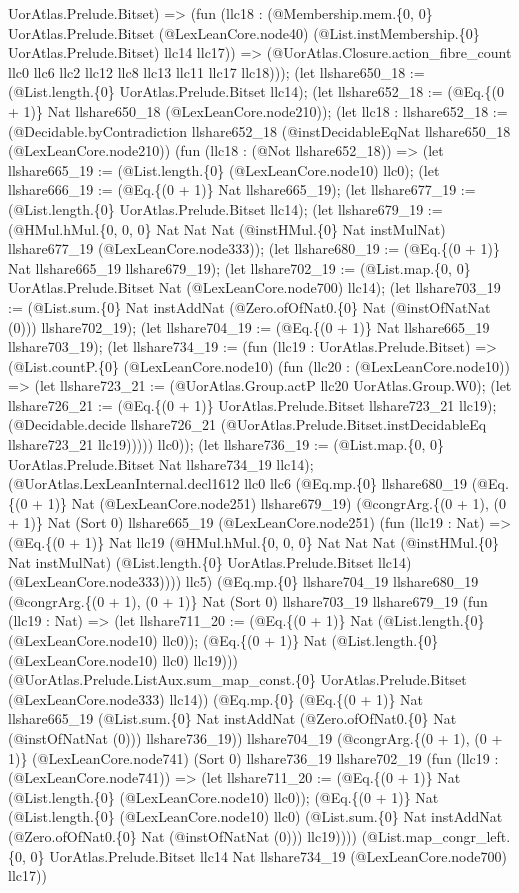 \documentclass[11pt]{article}
\begin{document}
UorAtlas.Prelude.Bitset) => (fun (llc18 : (@Membership.mem.\{0, 0\} UorAtlas.Prelude.Bitset (@LexLeanCore.node40) (@List.instMembership.\{0\} UorAtlas.Prelude.Bitset) llc14 llc17)) => (@UorAtlas.Closure.action\_fibre\_count llc0 llc6 llc2 llc12 llc8 llc13 llc11 llc17 llc18))); (let llshare650\_18 := (@List.length.\{0\} UorAtlas.Prelude.Bitset llc14); (let llshare652\_18 := (@Eq.\{(0 + 1)\} Nat llshare650\_18 (@LexLeanCore.node210)); (let llc18 : llshare652\_18 := (@Decidable.byContradiction llshare652\_18 (@instDecidableEqNat llshare650\_18 (@LexLeanCore.node210)) (fun (llc18 : (@Not llshare652\_18)) => (let llshare665\_19 := (@List.length.\{0\} (@LexLeanCore.node10) llc0); (let llshare666\_19 := (@Eq.\{(0 + 1)\} Nat llshare665\_19); (let llshare677\_19 := (@List.length.\{0\} UorAtlas.Prelude.Bitset llc14); (let llshare679\_19 := (@HMul.hMul.\{0, 0, 0\} Nat Nat Nat (@instHMul.\{0\} Nat instMulNat) llshare677\_19 (@LexLeanCore.node333)); (let llshare680\_19 := (@Eq.\{(0 + 1)\} Nat llshare665\_19 llshare679\_19); (let llshare702\_19 := (@List.map.\{0, 0\} UorAtlas.Prelude.Bitset Nat (@LexLeanCore.node700) llc14); (let llshare703\_19 := (@List.sum.\{0\} Nat instAddNat (@Zero.ofOfNat0.\{0\} Nat (@instOfNatNat (0))) llshare702\_19); (let llshare704\_19 := (@Eq.\{(0 + 1)\} Nat llshare665\_19 llshare703\_19); (let llshare734\_19 := (fun (llc19 : UorAtlas.Prelude.Bitset) => (@List.countP.\{0\} (@LexLeanCore.node10) (fun (llc20 : (@LexLeanCore.node10)) => (let llshare723\_21 := (@UorAtlas.Group.actP llc20 UorAtlas.Group.W0); (let llshare726\_21 := (@Eq.\{(0 + 1)\} UorAtlas.Prelude.Bitset llshare723\_21 llc19); (@Decidable.decide llshare726\_21 (@UorAtlas.Prelude.Bitset.instDecidableEq llshare723\_21 llc19))))) llc0)); (let llshare736\_19 := (@List.map.\{0, 0\} UorAtlas.Prelude.Bitset Nat llshare734\_19 llc14); (@UorAtlas.LexLeanInternal.decl1612 llc0 llc6 (@Eq.mp.\{0\} llshare680\_19 (@Eq.\{(0 + 1)\} Nat (@LexLeanCore.node251) llshare679\_19) (@congrArg.\{(0 + 1), (0 + 1)\} Nat (Sort 0) llshare665\_19 (@LexLeanCore.node251) (fun (llc19 : Nat) => (@Eq.\{(0 + 1)\} Nat llc19 (@HMul.hMul.\{0, 0, 0\} Nat Nat Nat (@instHMul.\{0\} Nat instMulNat) (@List.length.\{0\} UorAtlas.Prelude.Bitset llc14) (@LexLeanCore.node333)))) llc5) (@Eq.mp.\{0\} llshare704\_19 llshare680\_19 (@congrArg.\{(0 + 1), (0 + 1)\} Nat (Sort 0) llshare703\_19 llshare679\_19 (fun (llc19 : Nat) => (let llshare711\_20 := (@Eq.\{(0 + 1)\} Nat (@List.length.\{0\} (@LexLeanCore.node10) llc0)); (@Eq.\{(0 + 1)\} Nat (@List.length.\{0\} (@LexLeanCore.node10) llc0) llc19))) (@UorAtlas.Prelude.ListAux.sum\_map\_const.\{0\} UorAtlas.Prelude.Bitset (@LexLeanCore.node333) llc14)) (@Eq.mp.\{0\} (@Eq.\{(0 + 1)\} Nat llshare665\_19 (@List.sum.\{0\} Nat instAddNat (@Zero.ofOfNat0.\{0\} Nat (@instOfNatNat (0))) llshare736\_19)) llshare704\_19 (@congrArg.\{(0 + 1), (0 + 1)\} (@LexLeanCore.node741) (Sort 0) llshare736\_19 llshare702\_19 (fun (llc19 : (@LexLeanCore.node741)) => (let llshare711\_20 := (@Eq.\{(0 + 1)\} Nat (@List.length.\{0\} (@LexLeanCore.node10) llc0)); (@Eq.\{(0 + 1)\} Nat (@List.length.\{0\} (@LexLeanCore.node10) llc0) (@List.sum.\{0\} Nat instAddNat (@Zero.ofOfNat0.\{0\} Nat (@instOfNatNat (0))) llc19)))) (@List.map\_congr\_left.\{0, 0\} UorAtlas.Prelude.Bitset llc14 Nat llshare734\_19 (@LexLeanCore.node700) llc17)) 
\end{document}
